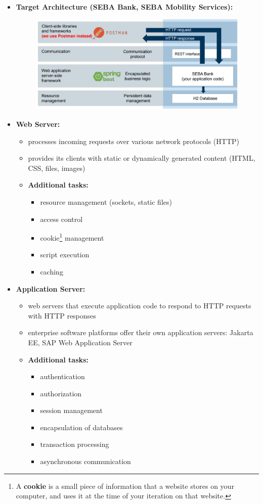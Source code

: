 \documentclass[ieeetran]{article}
\begin{document}
\begin{itemize}
\item \textbf{Target Architecture (SEBA Bank, SEBA Mobility Services):}
	\begin{figure}[h!]
	  \centering
	  \includegraphics[width=0.8\linewidth]{targetarchitecture.png}
	  \label{fig:targetarchitecture_png}
	\end{figure}

\item \textbf{Web Server:}
	\begin{itemize}
	  \item processes incoming requests over various network protocols (HTTP)
\item provides its clients with static or dynamically generated content (HTML, CSS, files, images)
	\item \textbf{Additional tasks:}
		\begin{itemize}
		  \item resource management (sockets, static files)
		\item access control
		\item cookie\footnote{A \textbf{cookie} is a small piece of information that a website stores on your computer, and uses it at the time of your iteration on that website.} management
				\item script execution
				\item caching
		\end{itemize}
	\end{itemize}
\item \textbf{Application Server:}
\begin{itemize}
  \item web servers that execute application code to respond to HTTP requests with HTTP responses
\item enterprise software platforms offer their own application servers: Jakarta EE, SAP Web Application Server

\item \textbf{Additional tasks:}
	\begin{itemize}
	  \item authentication
		  \item authorization
			  \item session management
				  \item encapsulation of databases
					 \item transaction processing
						 \item asynchronous communication 
	\end{itemize}
\end{itemize}


\end{itemize}
\end{document}
